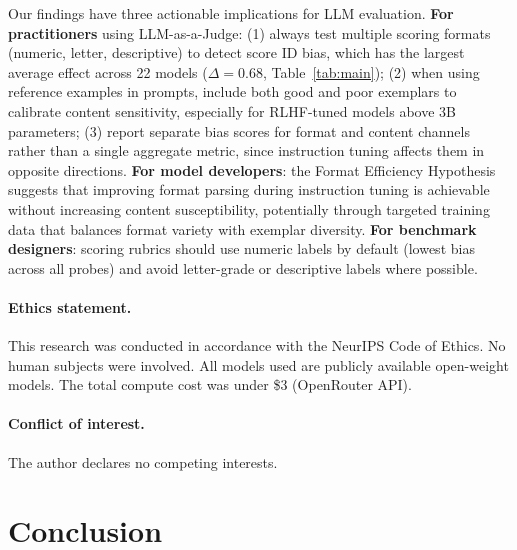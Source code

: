 \documentclass[11pt,twocolumn]{article}
\begin{document}
Our findings have three actionable implications for LLM evaluation. \textbf{For practitioners} using LLM-as-a-Judge: (1) always test multiple scoring formats (numeric, letter, descriptive) to detect score ID bias, which has the largest average effect across 22 models ($\Delta=0.68$, Table~\ref{tab:main}); (2) when using reference examples in prompts, include both good and poor exemplars to calibrate content sensitivity, especially for RLHF-tuned models above 3B parameters; (3) report separate bias scores for format and content channels rather than a single aggregate metric, since instruction tuning affects them in opposite directions. \textbf{For model developers}: the Format Efficiency Hypothesis suggests that improving format parsing during instruction tuning is achievable without increasing content susceptibility, potentially through targeted training data that balances format variety with exemplar diversity. \textbf{For benchmark designers}: scoring rubrics should use numeric labels by default (lowest bias across all probes) and avoid letter-grade or descriptive labels where possible.

\paragraph{Ethics statement.}
This research was conducted in accordance with the NeurIPS Code of Ethics. No human subjects were involved. All models used are publicly available open-weight models. The total compute cost was under \$3 (OpenRouter API).

\paragraph{Conflict of interest.}
The author declares no competing interests.

\section{Conclusion}
\end{document}
